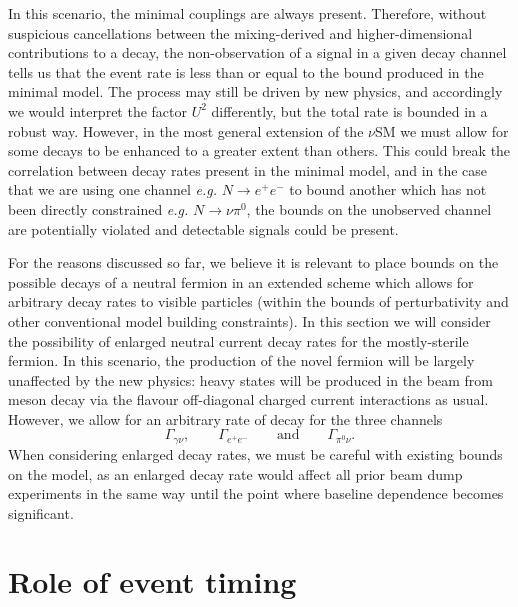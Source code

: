 \documentclass[11pt, a4paper]{article}
\begin{document}
In this scenario, the minimal couplings are always present. Therefore, without
suspicious cancellations between the mixing-derived and higher-dimensional
contributions to a decay, the non-observation of a signal in a given decay
channel tells us that the event rate is less than or equal to the bound
produced in the minimal model. The process may still be driven by new physics,
and accordingly we would interpret the factor $U^2$ differently, but the total
rate is bounded in a robust way. However, in the most general extension of the
$\nu$SM we must allow for some decays to be enhanced to a greater extent than
others. This could break the correlation between decay rates present in the
minimal model, and in the case that we are using one channel \emph{e.g.} $N\to
e^+e^-$ to bound another which has not been directly constrained \emph{e.g.}
$N\to\nu\pi^0$, the bounds on the unobserved channel are potentially violated 
and detectable signals could be present.

For the reasons discussed so far, we believe it is relevant to place bounds on
the possible decays of a neutral fermion in an extended scheme which allows for
arbitrary decay rates to visible particles (within the bounds of perturbativity
and other conventional model building constraints).
%
In this section we will consider the possibility of enlarged neutral current
decay rates for the mostly-sterile fermion. In this scenario, the production of
the novel fermion will be largely unaffected by the new physics: heavy states
will be produced in the beam from meson decay via the flavour off-diagonal
charged current interactions as usual. However, we allow for an arbitrary rate
of decay for the three channels
%
\[  \Gamma_{\gamma\nu},\qquad \Gamma_{e^+e^-}\qquad \text{and} \qquad
\Gamma_{\pi^0\nu}. \]
%
 When considering enlarged decay rates, we must be careful with existing bounds
on the model, as an enlarged decay rate would affect all prior beam dump
experiments in the same way until the point where baseline dependence becomes
significant. 

\section{\label{sec:timing}Role of event timing}
\end{document}
